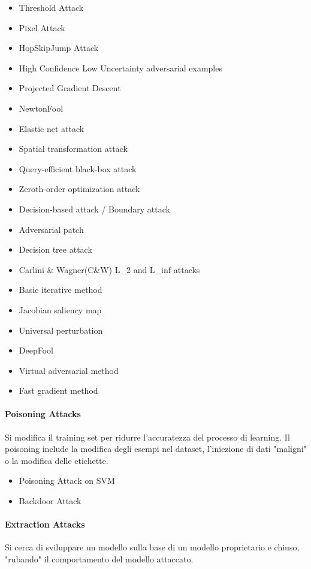 \begin{itemize}
    \item Threshold Attack
    \item Pixel Attack
    \item HopSkipJump Attack
    \item High Confidence Low Uncertainty adversarial examples
    \item Projected Gradient Descent
    \item NewtonFool
    \item Elastic net attack
    \item Spatial transformation attack
    \item Query-efficient black-box attack
    \item Zeroth-order optimization attack
    \item Decision-based attack / Boundary attack
    \item Adversarial patch
    \item Decision tree attack
    \item Carlini \& Wagner(C\&W) L\_2 and L\_inf attacks
    \item Basic iterative method
    \item Jacobian saliency map
    \item Universal perturbation
    \item DeepFool
    \item Virtual adversarial method
    \item Fast gradient method
\end{itemize} 
\paragraph{Poisoning Attacks}
Si modifica il training set per ridurre l'accuratezza del processo di learning. Il poisoning include la modifica degli esempi nel dataset, l'iniezione di dati "maligni" o la modifica
delle etichette. 


\begin{itemize}
    \item Poisoning Attack on SVM
    \item Backdoor Attack
\end{itemize}
\paragraph{Extraction Attacks} Si cerca di sviluppare un modello sulla base di un modello proprietario e chiuso, "rubando" il comportamento del modello attaccato.


